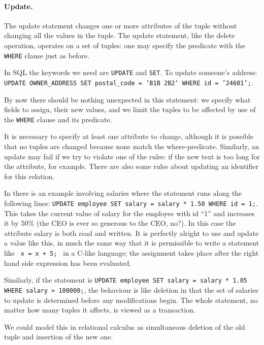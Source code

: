 \paragraph{Update.} 
The update statement changes one or more attributes of the tuple without changing all the values in the tuple. The update statement, like the delete operation, operates on a set of tuples: one may specify the predicate with the \texttt{WHERE} clause just as before. 

In SQL the keywords we need are \texttt{UPDATE} and \texttt{SET}.  To update someone's address: \texttt{UPDATE OWNER\_ADDRESS SET postal\_code = 'B1B 2B2` WHERE id = '24601';}. 

By now there should be nothing unexpected in this statement: we specify what fields to assign, their new values, and we limit the tuples to be affected by use of the \texttt{WHERE} clause and its predicate. 

It is necessary to specify at least one attribute to change, although it is possible that no tuples are changed because none match the where-predicate. Similarly, an update may fail if we try to violate one of the rules: if the new text is too long for the attribute, for example. There are also some rules about updating an identifier for this relation. 

In \cite{dsc} there is an example involving salaries where the statement runs along the following lines: \texttt{UPDATE employee SET salary = salary * 1.50 WHERE id = 1;}. This takes the current value of salary for the employee with id ``1'' and increases it by 50\% (the CEO is ever so generous to the CEO, no?). In this case the attribute salary is both read and written. It is perfectly alright to use and update a value like this, in much the same way that it is permissible to write a statement like \texttt{ x = x + 5; } in a C-like language; the assignment takes place after the right hand side expression has been evaluated.

Similarly, if the statement is \texttt{UPDATE employee SET salary = salary * 1.05 WHERE salary > 100000;}, the behaviour is like deletion in that the set of salaries to update is determined before any modifications begin. The whole statement, no matter how many tuples it affects, is viewed as a transaction. 


We could model this in relational calculus as simultaneous deletion of the old tuple and insertion of the new one. 





